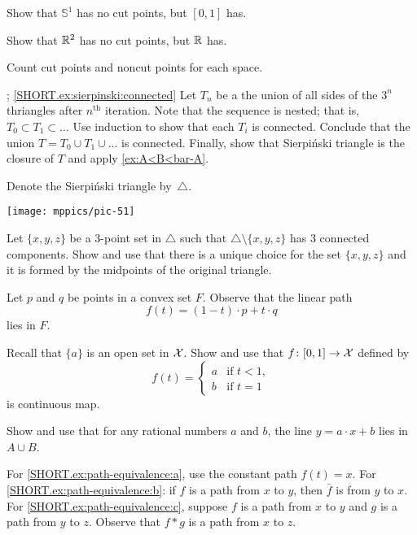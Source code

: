 \begin{multicols}{2}
Show that $\mathbb{S}^1$ has no cut points, but $[0,1]$ has.

Show that $\mathbb{R}^2$ has no cut points, but $\mathbb{R}$ has.

Count cut points and noncut points for each space.

\parbf{\ref{ex:sierpinski}};
\ref{SHORT.ex:sierpinski:connected}
Let $T_n$ be a the union of all sides of the $3^n$ thriangles after $n^{\text{th}}$ iteration.
Note that the sequence is nested; that is, $T_0\subset T_1\subset \dots{}$
Use induction to show that each $T_i$ is connected.
Conclude that the union $T=T_0\cup T_1\cup\dots$ is connected.
Finally, show that Sierpi\'nski triangle is the closure of $T$ and apply \ref{ex:A<B<bar-A}.

Denote the Sierpi\'nski triangle by~$\triangle$.

\begin{Figure}
\vskip-0mm
\centering
\texttt{[image: mppics/pic-51]}
\end{Figure}

Let $\{x,y,z\}$ be a 3-point set in $\triangle$ such that $\triangle \setminus\{x,y,z\}$ has 3 connected components.
Show and use that there is a unique choice for the set $\{x,y,z\}$ and 
it is formed by the midpoints of the original triangle.

Let $p$ and $q$ be points in a convex set $F$.
Observe that the linear path 
\[f(t)=(1-t)\cdot p+t\cdot q\]
lies in $F$.

Recall that $\{a\}$ is an open set in $\mathcal{X}$.
Show and use that $f\colon[0,1]\to\mathcal{X}$ defined by 
\[f(t)=
\begin{cases}
a&\text{if\ }t<1,
\\
b&\text{if\ }t=1
\end{cases}
\]
is continuous map.

Show and use that for any rational numbers $a$ and $b$, the line $y=a\cdot x+b$ lies in $A\cup B$.

 For \ref{SHORT.ex:path-equivalence:a}, use the constant path $f(t)=x$.
For \ref{SHORT.ex:path-equivalence:b}: if $f$ is a path from $x$ to $y$, then $\bar f$ is from $y$ to $x$.
For \ref{SHORT.ex:path-equivalence:c}, suppose $f$ is a path from $x$ to $y$ and $g$ is a path from $y$ to $z$.
Observe that $f*g$ is a path from $x$ to $z$.


\end{multicols}
